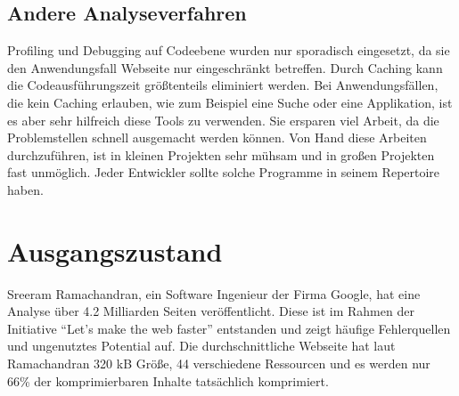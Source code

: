 \subsection{Andere Analyseverfahren}
Profiling und Debugging auf Codeebene wurden nur sporadisch eingesetzt, da sie den Anwendungsfall Webseite nur eingeschränkt betreffen. Durch Caching kann die Codeausführungszeit größtenteils eliminiert werden. Bei Anwendungsfällen, die kein Caching erlauben, wie zum Beispiel eine Suche oder eine Applikation, ist es aber sehr hilfreich diese Tools zu verwenden. Sie ersparen viel Arbeit, da die Problemstellen schnell ausgemacht werden können. Von Hand diese Arbeiten durchzuführen, ist in kleinen Projekten sehr mühsam und in großen Projekten fast unmöglich. Jeder Entwickler sollte solche Programme in seinem Repertoire haben.
\section{Ausgangszustand}  
Sreeram Ramachandran, ein Software Ingenieur der Firma Google, hat eine Analyse über 4.2 Milliarden Seiten veröffentlicht. Diese ist im Rahmen der Initiative "`Let's make the web faster"' entstanden und zeigt häufige Fehlerquellen und ungenutztes Potential auf. Die durchschnittliche Webseite hat laut Ramachandran 320 kB Größe, 44 verschiedene Ressourcen und es werden nur 66\% der komprimierbaren Inhalte tatsächlich komprimiert.\citep{Google2011a}
